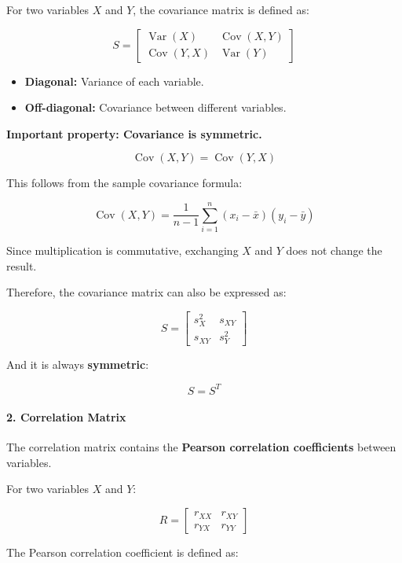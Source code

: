 \documentclass[11pt]{article}
\providecommand{\tightlist}{%
      \setlength{\itemsep}{0pt}\setlength{\parskip}{0pt}}
\begin{document}
For two variables \(X\) and \(Y\), the covariance matrix is defined as:

\[
S =
\begin{bmatrix}
\operatorname{Var}(X) & \operatorname{Cov}(X,Y) \\
\operatorname{Cov}(Y,X) & \operatorname{Var}(Y)
\end{bmatrix}
\]

\begin{itemize}
\tightlist
\item
  \textbf{Diagonal:} Variance of each variable.
\item
  \textbf{Off-diagonal:} Covariance between different variables.
\end{itemize}

\textbf{Important property: Covariance is symmetric.}

\[
\boxed{\operatorname{Cov}(X,Y)=\operatorname{Cov}(Y,X)}
\]

This follows from the sample covariance formula:

\[
\operatorname{Cov}(X,Y)
=
\frac{1}{n-1}
\sum_{i=1}^{n}
(x_i-\bar{x})(y_i-\bar{y})
\]

Since multiplication is commutative, exchanging \(X\) and \(Y\) does not
change the result.

Therefore, the covariance matrix can also be expressed as:

\[
S =
\begin{bmatrix}
s_X^2 & s_{XY} \\
s_{XY} & s_Y^2
\end{bmatrix}
\]

And it is always \textbf{symmetric}:

\[
\boxed{S=S^T}
\]

\paragraph{2. Correlation Matrix}\label{correlation-matrix}

The correlation matrix contains the \textbf{Pearson correlation
coefficients} between variables.

For two variables \(X\) and \(Y\):

\[
R =
\begin{bmatrix}
r_{XX} & r_{XY} \\
r_{YX} & r_{YY}
\end{bmatrix}
\]

The Pearson correlation coefficient is defined as:
\end{document}
